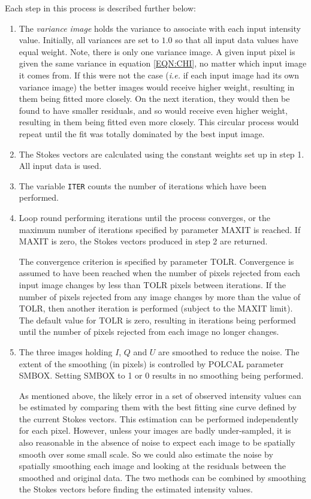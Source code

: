 \documentclass[twoside,11pt]{starlink}
\begin{document}
Each step in this process is described further below:

\begin{enumerate}

\item The \emph{variance image} holds the variance to associate with each
input intensity value. Initially, all variances are set to $1.0$ so that
all input data values have equal weight. Note, there is only one variance
image. A given input pixel is given the same variance in equation
\ref{EQN:CHI}, no matter which input image it comes from. If this were
not the case (\emph{i.e.} if each input image had its own variance image)
the better images would receive higher weight, resulting in them being
fitted more closely. On the next iteration, they would then be found to
have smaller residuals, and so would receive even higher weight,
resulting in them being fitted even more closely. This circular process
would repeat until the fit was totally dominated by the best input image.

\item The Stokes vectors are calculated using the constant weights set up
in step 1. All input data is used.

\item The variable \verb+ITER+ counts the number of iterations which have
been performed.

\item Loop round performing iterations until the process converges, or
the maximum number of iterations specified by parameter MAXIT is reached.
If MAXIT is zero, the Stokes vectors produced in step 2 are returned.

The convergence criterion is specified by parameter TOLR. Convergence is
assumed to have been reached when the number of pixels rejected from each
input image changes by less than TOLR pixels between iterations. If the
number of pixels rejected from any image changes by more than the value
of TOLR, then another iteration is performed (subject to the MAXIT limit).
The default value for TOLR is zero, resulting in iterations being
performed until the number of pixels rejected from each image no longer
changes.

\item The three images holding $I$, $Q$ and $U$ are smoothed to reduce
the noise. The extent of the smoothing (in pixels) is controlled by POLCAL
parameter SMBOX. Setting SMBOX to 1 or 0 results in no smoothing
being performed.

As mentioned above, the likely error in a set of observed intensity
values can be estimated by comparing them with the best fitting sine
curve defined by the current Stokes vectors. This estimation can be
performed independently for each pixel. However, unless your images are
badly under-sampled, it is also reasonable in the absence of noise to
expect each image to be spatially smooth over some small scale. So we
could also estimate the noise by spatially smoothing each image and
looking at the residuals between the smoothed and original data. The two
methods can be combined by smoothing the Stokes vectors before finding the
estimated intensity values.


\end{enumerate}
\end{document}
